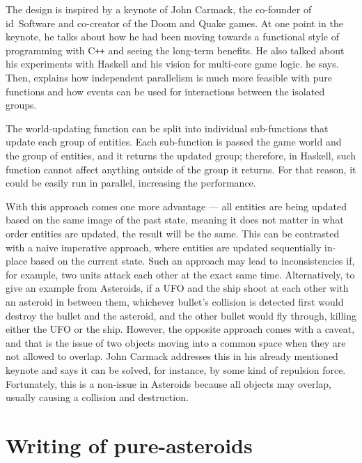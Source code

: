 \documentclass[
  digital, %
  color,   %
  table,   %
  oneside, %
  lof,     %
  lot,     %
]{fithesis3}
\newcommand{\cpp}{C\nolinebreak\texttt{+}\nolinebreak\texttt{+}}
\begin{document}
The design is inspired by a keynote \cite{carmackkeynote} of John Carmack, the co-founder
of id~Software and co-creator of the Doom and Quake games.%
At one point in the keynote, he talks about how he had been moving towards
a functional style of programming with \cpp{} and seeing the long-term benefits.
He also talked about his experiments with Haskell and his vision for multi-core
game logic.  he says.
Then, explains how independent parallelism is much more feasible with pure
functions and how events can be used for interactions between the isolated groups.

The world-updating function can be split into individual sub-functions that update each group
of entities. Each sub-function is passed the game world and the group of entities, and
it returns the updated group; therefore, in Haskell, such function cannot affect
anything outside of the group it returns. For that reason, it could be easily run
in parallel, increasing the performance.

With this approach comes one more advantage
--- all entities are being updated based on the same image of the past state, meaning
it does not matter in what order entities are updated, the result will be the same.
This can be contrasted with a naive imperative approach, where entities are
updated sequentially in-place based on the current state. Such an approach may lead to
inconsistencies if, for example, two units attack each other at the exact same time.
Alternatively, to give an example from Asteroids, if a UFO and the ship shoot at each other
with an asteroid in between them, whichever bullet's collision is detected first
would destroy the bullet and the asteroid, and the other bullet would fly through,
killing either the UFO or the ship. However, the opposite approach comes with a caveat,
and that is the issue of two objects moving into a common space when they are not allowed to overlap.
John Carmack addresses this in his already mentioned keynote \cite{carmackkeynote} and
says it can be solved, for instance, by some kind of repulsion force. Fortunately, this
is a non-issue in Asteroids because all objects may overlap, usually causing a collision
and destruction.



\section{Writing of pure-asteroids}
\label{sect:pureimplementation}
\end{document}
